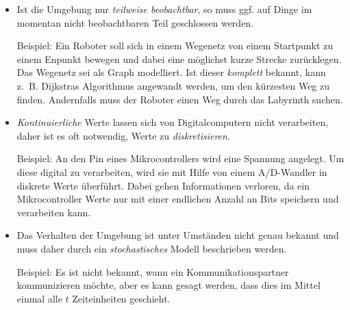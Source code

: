 \documentclass[a4paper]{scrartcl}
\begin{document}
\begin{itemize}
    \item
        Ist die Umgebung nur \emph{teilweise beobachtbar}, so muss ggf. auf Dinge im
        momentan nicht beobachtbaren Teil geschlossen werden.

        Beispiel: Ein Roboter soll sich in einem Wegenetz von einem Startpunkt zu einem
        Enpunkt bewegen und dabei eine möglichst kurze Strecke zurücklegen.  Das
        Wegenetz sei als Graph modelliert.  Ist dieser \emph{komplett} bekannt, kann
        z.~B. Dijkstras Algorithmus angewandt werden, um den kürzesten Weg zu finden.
        Andernfalls muss der Roboter einen Weg durch das Labyrinth suchen.

    \item
        \emph{Kontinuierliche} Werte lassen sich von Digitalcomputern nicht verarbeiten,
        daher ist es oft notwendig, Werte zu \emph{diskretisieren}.

        Beispiel: An den Pin eines Mikrocontrollers wird eine Spannung angelegt. Um
        diese digital zu verarbeiten, wird sie mit Hilfe von einem A/D-Wandler in
        diskrete Werte überführt. Dabei gehen Informationen verloren, da ein
        Mikrocontroller Werte nur mit einer endlichen Anzahl an Bits speichern und
        verarbeiten kann.

    \item
        Das Verhalten der Umgebung ist unter Umständen nicht genau bekannt und muss
        daher durch ein \emph{stochastisches} Modell beschrieben werden.

        Beispiel: Es ist nicht bekannt, wann ein Kommunikationspartner kommunizieren
        möchte, aber es kann gesagt werden, dass dies im Mittel einmal alle $t$
        Zeiteinheiten geschieht.
\end{itemize}
\end{document}
